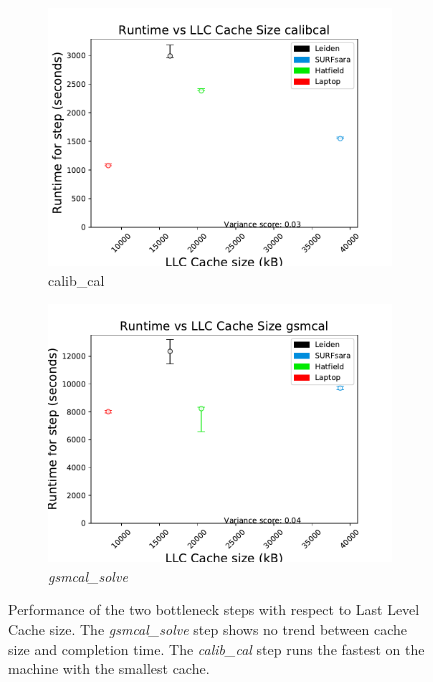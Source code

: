 \begin{figure}
\begin{minipage}[b]{0.45\textwidth}
\begin{subfigure}[b]{\linewidth}
    \includegraphics[width=\textwidth]{ch4/figures/fig8/calibcal_LLC.pdf}
      \caption{calib\_cal }
	\label{calib_cal_cache}
 \end{subfigure}%

\vspace*{5mm} %
\begin{subfigure}[b]{\linewidth}
    \includegraphics[width=\textwidth]{ch4/figures/fig8/gsmcal_LLC.pdf}
      \caption{\textit{gsmcal\_solve}}
	\label{gsmcal_cache}
 \end{subfigure}
 \label{cache_3_steps}
 \caption{Performance of the two bottleneck steps with respect to Last Level Cache size. The \textit{gsmcal\_solve} step shows no trend between cache size and completion time. The \textit{calib\_cal} step runs the fastest on the machine with the smallest cache.  } 
\end{minipage}
\end{figure}

